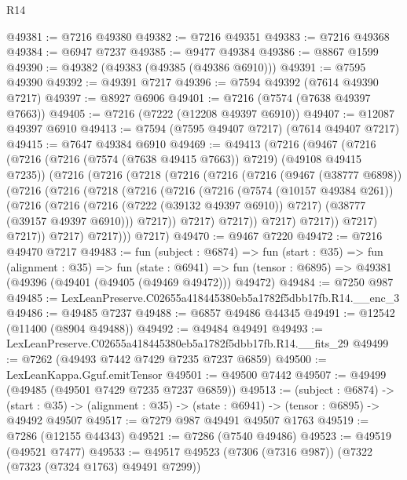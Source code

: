 \begin{lexlean}{R14}
\begin{coremodule}
@49381 := @7216 @49380
@49382 := @7216 @49351
@49383 := @7216 @49368
@49384 := @6947 @7237
@49385 := @9477 @49384
@49386 := @8867 @1599
@49390 := @49382 (@49383 (@49385 (@49386 @6910)))
@49391 := @7595 @49390
@49392 := @49391 @7217
@49396 := @7594 @49392 (@7614 @49390 @7217)
@49397 := @8927 @6906
@49401 := @7216 (@7574 (@7638 @49397 @7663))
@49405 := @7216 (@7222 (@12208 @49397 @6910))
@49407 := @12087 @49397 @6910
@49413 := @7594 (@7595 @49407 @7217) (@7614 @49407 @7217)
@49415 := @7647 @49384 @6910
@49469 := @49413
    (@7216
      (@9467
        (@7216
          (@7216 (@7216 (@7574 (@7638 @49415 @7663)) @7219) (@49108 @49415 @7235))
          (@7216
            (@7216
              (@7218
                (@7216
                  (@7216
                    (@7216
                      (@9467 (@38777 @6898))
                      (@7216
                        (@7216
                          (@7218
                            (@7216
                              (@7216
                                (@7216
                                  (@7574 (@10157 @49384 @261))
                                  (@7216
                                    (@7216
                                      (@7216 (@7222 (@39132 @49397 @6910)) @7217)
                                      (@38777 (@39157 @49397 @6910)))
                                    @7217))
                                @7217)
                              @7217))
                          @7217)
                        @7217))
                    @7217)
                  @7217))
              @7217)
            @7217)))
      @7217)
@49470 := @9467 @7220
@49472 := @7216 @49470 @7217
@49483 := fun (subject : @6874) =>
  fun (start : @35) =>
  fun (alignment : @35) =>
  fun (state : @6941) =>
  fun (tensor : @6895) => @49381 (@49396 (@49401 (@49405 (@49469 @49472))) @49472)
@49484 := @7250 @987
@49485 := LexLeanPreserve.C02655a418445380eb5a1782f5dbb17fb.R14.__enc_3
@49486 := @49485 @7237
@49488 := @6857 @49486 @44345
@49491 := @12542 (@11400 (@8904 @49488))
@49492 := @49484 @49491
@49493 := LexLeanPreserve.C02655a418445380eb5a1782f5dbb17fb.R14.__fits_29
@49499 := @7262 (@49493 @7442 @7429 @7235 @7237 @6859)
@49500 := LexLeanKappa.Gguf.emitTensor
@49501 := @49500 @7442
@49507 := @49499 (@49485 (@49501 @7429 @7235 @7237 @6859))
@49513 := (subject : @6874) ->
  (start : @35) -> (alignment : @35) -> (state : @6941) -> (tensor : @6895) -> @49492 @49507
@49517 := @7279 @987 @49491 @49507 @1763
@49519 := @7286 (@12155 @44343)
@49521 := @7286 (@7540 @49486)
@49523 := @49519 (@49521 @7477)
@49533 := @49517 @49523 (@7306 (@7316 @987)) (@7322 (@7323 (@7324 @1763) @49491 @7299))

\end{coremodule}
\end{lexlean}
